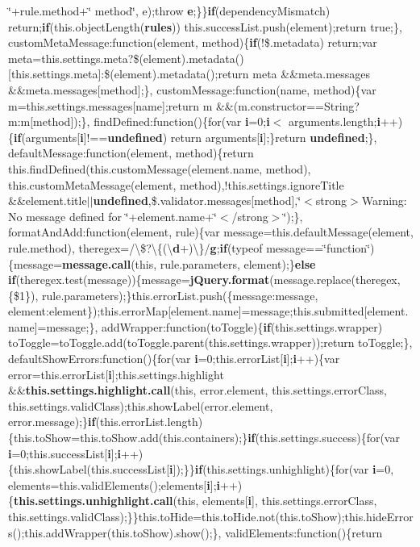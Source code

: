 {\begin{DoxyParamCaption}
\textquotesingle{}\char`\"{}+rule.\+method+\char`\"{}\textquotesingle{} method\char`\"{}, e);throw {\bf e};\}\}{\bf if}(dependency\+Mismatch) return;{\bf if}(this.\+object\+Length({\bf rules})) this.\+success\+List.\+push(element);return true;\},   custom\+Meta\+Message\+:function(element, method)\{{\bf if}(!\$.metadata) return;var meta=this.\+settings.\+meta?\$(element).metadata()\mbox{[}this.\+settings.\+meta\mbox{]}\+:\$(element).metadata();return meta \&\&meta.\+messages \&\&meta.\+messages\mbox{[}method\mbox{]};\}, custom\+Message\+:function(name, method)\{var m=this.\+settings.\+messages\mbox{[}name\mbox{]};return m \&\&(m.\+constructor==String?m\+:m\mbox{[}method\mbox{]});\}, find\+Defined\+:function()\{for(var {\bf i}=0;{\bf i}$<$ arguments.\+length;{\bf i}++)\{{\bf if}(arguments\mbox{[}{\bf i}\mbox{]}!=={\bf undefined}) return arguments\mbox{[}{\bf i}\mbox{]};\}return {\bf undefined};\}, default\+Message\+:function(element, method)\{return this.\+find\+Defined(this.\+custom\+Message(element.\+name, method), this.\+custom\+Meta\+Message(element, method),!this.\+settings.\+ignore\+Title \&\&element.\+title$\vert$$\vert${\bf undefined},\$.validator.\+messages\mbox{[}method\mbox{]},\char`\"{}$<$strong$>$Warning\+: No message defined for \char`\"{}+element.\+name+\char`\"{}$<$/strong$>$\char`\"{});\}, format\+And\+Add\+:function(element, rule)\{var message=this.\+default\+Message(element, rule.\+method), theregex=/\textbackslash{}\$?\textbackslash{}\{(\textbackslash{}{\bf d}+)\textbackslash{}\}/{\bf g};{\bf if}(typeof message==\char`\"{}function\char`\"{})\{message={\bf message.\+call}(this, rule.\+parameters, element);\}{\bf else} {\bf if}(theregex.\+test(message))\{message={\bf j\+Query.\+format}(message.\+replace(theregex, \textquotesingle{}\{\$1\}\textquotesingle{}), rule.\+parameters);\}this.\+error\+List.\+push(\{message\+:message, element\+:element\});this.\+error\+Map\mbox{[}element.\+name\mbox{]}=message;this.\+submitted\mbox{[}element.\+name\mbox{]}=message;\}, add\+Wrapper\+:function(to\+Toggle)\{{\bf if}(this.\+settings.\+wrapper) to\+Toggle=to\+Toggle.\+add(to\+Toggle.\+parent(this.\+settings.\+wrapper));return to\+Toggle;\}, default\+Show\+Errors\+:function()\{for(var {\bf i}=0;this.\+error\+List\mbox{[}{\bf i}\mbox{]};{\bf i}++)\{var error=this.\+error\+List\mbox{[}{\bf i}\mbox{]};this.\+settings.\+highlight \&\&{\bf this.\+settings.\+highlight.\+call}(this, error.\+element, this.\+settings.\+error\+Class, this.\+settings.\+valid\+Class);this.\+show\+Label(error.\+element, error.\+message);\}{\bf if}(this.\+error\+List.\+length)\{this.\+to\+Show=this.\+to\+Show.\+add(this.\+containers);\}{\bf if}(this.\+settings.\+success)\{for(var {\bf i}=0;this.\+success\+List\mbox{[}{\bf i}\mbox{]};{\bf i}++)\{this.\+show\+Label(this.\+success\+List\mbox{[}{\bf i}\mbox{]});\}\}{\bf if}(this.\+settings.\+unhighlight)\{for(var {\bf i}=0, elements=this.\+valid\+Elements();elements\mbox{[}{\bf i}\mbox{]};{\bf i}++)\{{\bf this.\+settings.\+unhighlight.\+call}(this, elements\mbox{[}{\bf i}\mbox{]}, this.\+settings.\+error\+Class, this.\+settings.\+valid\+Class);\}\}this.\+to\+Hide=this.\+to\+Hide.\+not(this.\+to\+Show);this.\+hide\+Errors();this.\+add\+Wrapper(this.\+to\+Show).show();\}, valid\+Elements\+:function()\{return 
\end{DoxyParamCaption}}
